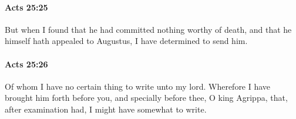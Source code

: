 		\paragraph{Acts 25:25} %
			\label{ACTS-25-25}

			But when I found that he had committed nothing worthy of death, and that he himself hath appealed to Augustus, I have determined to send him.

			\begin{framed}
			\scriptsize
				\begin{compactdesc}
					\item[SBLG] 
				\end{compactdesc}
			\end{framed}

		\paragraph{Acts 25:26} %
			\label{ACTS-25-26}

			Of whom I have no certain thing to write unto my lord.  Wherefore I have brought him forth before you, and specially before thee, O king Agrippa, that, after examination had, I might have somewhat to write.

